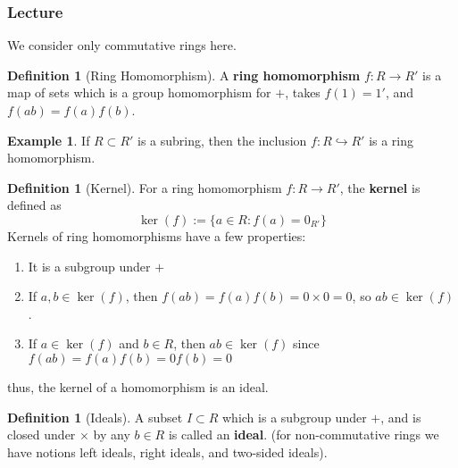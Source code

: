 \documentclass[12pt]{article}
\theoremstyle{definition}
\newtheorem{defn}[thm]{Definition}
\newtheorem{eg}[thm]{Example}
\theoremstyle{remark}
\numberwithin{equation}{section}
\newcommand\B[1]{\textbf{ #1}}
\begin{document}
\subsubsection{Lecture}

We consider only commutative rings here.

\begin{defn}[Ring Homomorphism]
        A \B{ring homomorphism} $f:R \rightarrow R'$ is a map of sets which is a group homomorphism for $+$, takes $f(1) = 1'$, and $f(ab) = f(a)f(b)$.
\end{defn}


\vspace{15pt}

\begin{eg}
        If $R \subset R'$ is a subring, then the inclusion $f: R \hookrightarrow R'$ is a ring homomorphism.
\end{eg}


\vspace{15pt}

\begin{defn}[Kernel]
        For a ring homomorphism $f:R\rightarrow R'$, the \B{kernel} is defined as \begin{equation}
                \ker(f) := \{a \in R: f(a) = 0_{R'}\}
        \end{equation}
        Kernels of ring homomorphisms have a few properties: \begin{enumerate}
                \item It is a subgroup under $+$
                \item If $a,b \in \ker(f)$, then $f(ab) = f(a)f(b) = 0\times 0 = 0$, so $ab \in \ker(f)$.
                \item If $a \in \ker(f)$ and $b \in R$, then $ab \in \ker(f)$ since $f(ab) = f(a)f(b) = 0f(b) = 0$
        \end{enumerate}
        thus, the kernel of a homomorphism is an ideal.
\end{defn}


\vspace{15pt}

\begin{defn}[Ideals]
        A subset $I \subset R$ which is a subgroup under $+$, and is closed under $\times$ by any $b\in R$ is called an \B{ideal}. (for non-commutative rings we have notions left ideals, right ideals, and two-sided ideals).
\end{defn}


\vspace{15pt}
\end{document}
